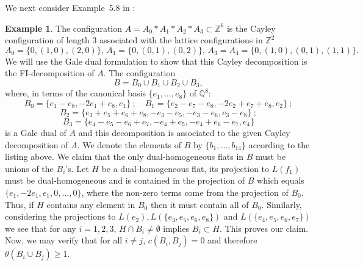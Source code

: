 \documentclass[11pt]{amsart}
\theoremstyle{plain}
\theoremstyle{definition}
\newtheorem{example}[theorem]{Example}
\theoremstyle{remark}
\newcommand{\baseRing}[1]{\ensuremath{\mathbb{#1}}}
\newcommand{\Z}{\baseRing{Z}}
\newcommand{\Q}{\baseRing{Q}}
\numberwithin{equation}{section}
\begin{document}
We next consider Example~5.8 in \cite{FI}:

\begin{example} \label{ex:complete}
The configuration $A=A_0*A_1*A_2*A_3 \subset \Z^{6}$ is the Cayley configuration of length $3$ associated with the lattice configurations in $\Z^2$ 
$$A_0 = \{0, (1,0), (2,0)\}, \, A_1 = \{ 0, (0,1), (0,2)\}, \, A_3 = A_4 = \{ 0, (1,0), (0,1), (1,1)\}.$$
We will use the Gale dual formulation to show that this Cayley decomposition is the FI-decomposition of $A$.
The configuration 
\begin{equation}\label{eq:Bito}
B = B_0 \cup B_1 \cup B_2 \cup B_3,
\end{equation}
where, in terms of the canonical basis $\{e_1,\dots,e_8\}$ of $\Q^8$:
$$B_0 = \{e_1-e_8, -2e_1+e_8,e_1\}\ ;\quad
B_1 = \{e_2-e_7-e_8, -2e_2+e_7+e_8,e_2\}\ ;$$
$$B_2 = \{e_3 +e_5+e_6+e_8, -e_3-e_5, -e_3 - e_6,e_3 -e_8\}\ ;$$
$$
B_3 = \{e_4 -e_5-e_6+e_7, -e_4+e_5, -e_4 + e_6 -e_7, e_4\}
$$
is a Gale dual of $A$ and this decomposition is associated to the given Cayley decomposition of $A$.
We denote the elements of $B$ by $\{b_1,\dots,b_{14}\}$ according to the listing above. %
We claim that the only dual-homogeneous 
 flats in $B$ must be unions of the $B_i$'s. Let $H$ be a dual-homogeneous flat, its projection  to
 $L(f_1)$ must be dual-homogeneous and is contained  
in the projection of  $B$ which equals $\{e_1, -2 e_1, e_1, 0, \dots, 0\}$, where the non-zero terms come from the projection of $B_0$. Thus,  if $H$ contains
 any element in $B_0$ then it must contain all of $B_0$. Similarly, considering the projections to $L(e_2), L(\{e_3,e_5,e_6,e_8\})$ and
 $L(\{e_4,e_5,e_6,e_7\})$ we see that for any $i=1,2,3$, $H \cap B_i \not =\emptyset$ implies $B_i \subset H $.  
 This proves our claim.
  Now, we may verify that for all $i\not=j$, 
$c(B_i,B_j)=0$ and therefore $\theta(B_i \cup B_j) \geq 1$.

\end{example}
\end{document}
